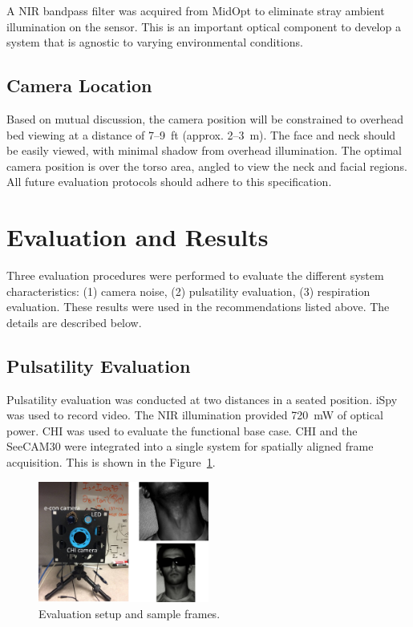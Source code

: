 \documentclass{article}
\begin{document}
A NIR bandpass filter was acquired from MidOpt to eliminate stray ambient illumination on the sensor. This is an important optical component to develop a system that is agnostic to varying environmental conditions.


\subsection{Camera Location}
Based on mutual discussion, the camera position will be constrained to overhead bed viewing at a distance of 7--9~ft (approx. 2--3~m). The face and neck should be easily viewed, with minimal shadow from overhead illumination. The optimal camera position is over the torso area, angled to view the neck and facial regions. All future evaluation protocols should adhere to this specification.

\section{Evaluation and Results}
Three evaluation procedures were performed to evaluate the different system characteristics: (1) camera noise, (2) pulsatility evaluation, (3) respiration evaluation. These results were used in the recommendations listed above. The details are described below.

\subsection{Pulsatility Evaluation}
Pulsatility evaluation was conducted at two distances in a seated position. iSpy was used to record video. The NIR illumination provided 720~mW of optical power. CHI was used to evaluate the functional base case. CHI and the SeeCAM30 were integrated into a single system for spatially aligned frame acquisition. This is shown in the Figure~\ref{fig:setup}.

\begin{figure}[H]
\centering
\includegraphics[width=0.5\textwidth]{setup}
\caption{Evaluation setup and sample frames.}
\label{fig:setup}
\end{figure}
\end{document}
